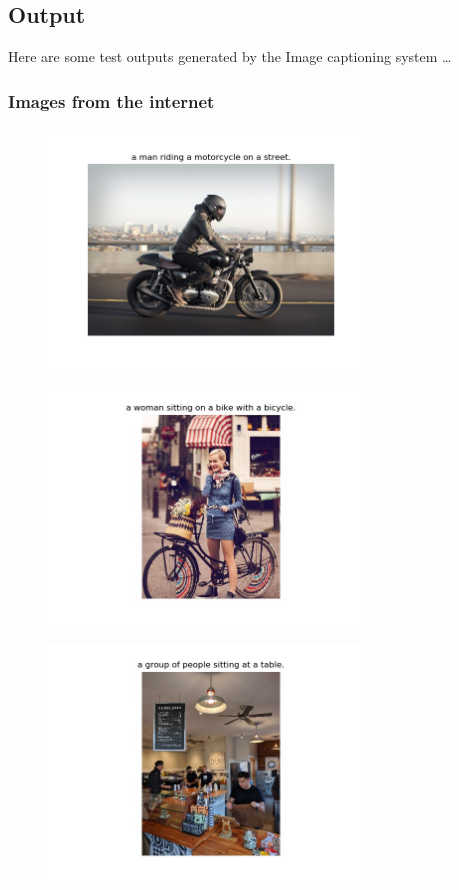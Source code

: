 \subsection{Output}
Here are some test outputs generated by the Image captioning system \dots

\subsubsection{Images from the internet }
\begin{figure}[ht!]
\includegraphics[width=0.75\textwidth]{assets/eg/r2_out.jpg}
\end{figure}
\begin{figure}[ht!]
\includegraphics[width=0.75\textwidth]{assets/eg/r3_out.jpg}
\end{figure}
\begin{figure}[ht!]
\includegraphics[width=0.75\textwidth]{assets/eg/r4_out.jpg}
\end{figure}

